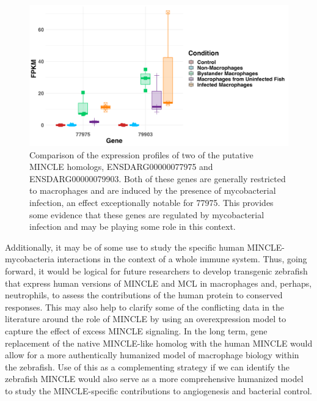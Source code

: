 \begin{figure}
\centering
\includegraphics[width=\textwidth]{images/mincle_expression.png}
\caption{Comparison of the expression profiles of two of the putative MINCLE homologs, ENSDARG00000077975 and ENSDARG00000079903. Both of these genes are generally restricted to macrophages and are induced by the presence of mycobacterial infection, an effect exceptionally notable for 77975. This provides some evidence that these genes are regulated by mycobacterial infection and may be playing some role in this context.}
\label{figure:mincles}
\end{figure}

Additionally, it may be of some use to study the specific human MINCLE-mycobacteria interactions in the context of a whole immune system. Thus, going forward, it would be logical for future researchers to develop transgenic zebrafish that express human versions of MINCLE and MCL in macrophages and, perhaps, neutrophils, to assess the contributions of the human protein to conserved responses. This may also help to clarify some of the conflicting data in the literature around the role of MINCLE by using an overexpression model to capture the effect of excess MINCLE signaling. In the long term, gene replacement of the native MINCLE-like homolog with the human MINCLE would allow for a more authentically humanized model of macrophage biology within the zebrafish. Use of this as a complementing strategy if we can identify the zebrafish MINCLE would also serve as a more comprehensive humanized model to study the MINCLE-specific contributions to angiogenesis and bacterial control.

\singlespacing

